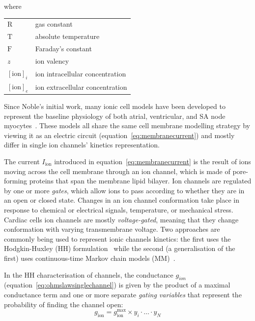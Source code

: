 \noindent
where

\vspace{0.2cm}
\begin{tabular}{ll}
    $\textrm{R}$  & gas constant \\
    $\textrm{T}$  & absolute temperature \\
    $\textrm{F}$  & Faraday's constant \\
    $z$           & ion valency \\
    $[\textrm{ion}]_{i}$  & ion intracellular concentration \\
    $[\textrm{ion}]_{e}$  & ion extracellular concentration \\
\end{tabular}

\vspace{0.2cm}
Since Noble's initial work, many ionic cell models have been developed to represent the baseline physiology of both atrial, ventricular, and SA node myocytes~\cite{Corrado:2020}. These models all share the same cell membrane modelling strategy by viewing it as an electric circuit (equation~\eqref{eq:membranecurrent}) and mostly differ in single ion channels' kinetics representation.

\vspace{0.2cm}\noindent
The current $I_{\textrm{ion}}$ introduced in equation~\eqref{eq:membranecurrent} is the result of ions moving across the cell membrane through an ion channel, which is made of pore-forming proteins that span the membrane lipid bilayer. Ion channels are regulated by one or more \textit{gates}, which allow ions to pass according to whether they are in an open or closed state. Changes in an ion channel conformation take place in response to chemical or electrical signals, temperature, or mechanical stress. Cardiac cells ion channels are mostly \textit{voltage-gated}, meaning that they change conformation with varying transmembrane voltage. Two approaches are commonly being used to represent ionic channels kinetics: the first uses the Hodgkin-Huxley (\acs{HH}) formulation~\cite{Hodgkin:1952} while the second (a generalisation of the first) uses continuous-time Markov chain models (\acs{MM})~\cite{Fink:2009}.

\vspace{0.2cm}
In the HH characterisation of channels, the conductance $g_{ion}$ (equation~\eqref{eq:ohmslawsinglechannel}) is given by the product of a maximal conductance term and one or more separate \textit{gating variables} that represent the probability of finding the channel open:
%
\begin{equation}
    g_{\textrm{ion}} = g_{\textrm{ion}}^{\textrm{max}}\times y_i\cdot\dots\cdot y_N
\end{equation}

